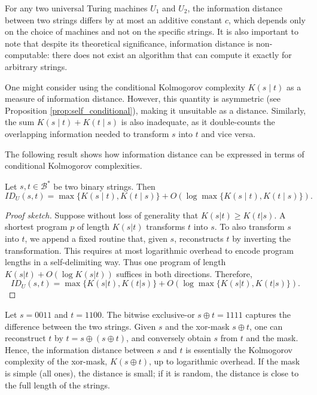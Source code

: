 For any two universal Turing machines $U_1$ and $U_2$, the information distance between two strings differs by at most an additive constant $c$, which depends only on the choice of machines and not on the specific strings. It is also important to note that despite its theoretical significance, information distance is non-computable: there does not exist an algorithm that can compute it exactly for arbitrary strings.

One might consider using the conditional Kolmogorov complexity $K(s \mid t)$ as a measure of information distance. However, this quantity is asymmetric (see Proposition \ref{prop:self_conditional}), making it unsuitable as a distance. Similarly, the sum $K(s \mid t) + K(t \mid s)$ is also inadequate, as it double-counts the overlapping information needed to transform $s$ into $t$ and vice versa.

The following result shows how information distance can be expressed in terms of conditional Kolmogorov complexities.

\begin{proposition}
Let $s,  t \in \mathcal{B}^{\ast}$ be two binary strings. Then
\[
ID_U(s, t) = \max\{ K(s \mid t), K(t \mid s) \} + O ( \log \max\{ K(s \mid t), K(t \mid s) \}).
\]
\end{proposition}
\begin{proof}[Proof sketch]
Suppose without loss of generality that $K(s|t) \geq K(t|s)$. A shortest program $p$ of length $K(s|t)$ transforms $t$ into $s$. To also transform $s$ into $t$, we append a fixed routine that, given $s$, reconstructs $t$ by inverting the transformation. This requires at most logarithmic overhead to encode program lengths in a self-delimiting way. 
Thus one program of length $K(s|t) + O(\log K(s|t))$ suffices in both directions. Therefore,
\[
ID_U(s,t) = \max\{K(s|t),K(t|s)\} + O(\log \max\{K(s|t),K(t|s)\}).
\]
\end{proof}

\begin{example}
Let $s=0011$ and $t=1100$. The bitwise exclusive-or $s \oplus t = 1111$ captures the difference between the two strings. 
Given $s$ and the xor-mask $s \oplus t$, one can reconstruct $t$ by $t = s \oplus (s \oplus t)$, and conversely obtain $s$ from $t$ and the mask. Hence, the information distance between $s$ and $t$ is essentially the Kolmogorov complexity of the xor-mask, $K(s \oplus t)$, up to logarithmic overhead. If the mask is simple (all ones), the distance is small; if it is random, the distance is close to the full length of the strings.
\end{example}

